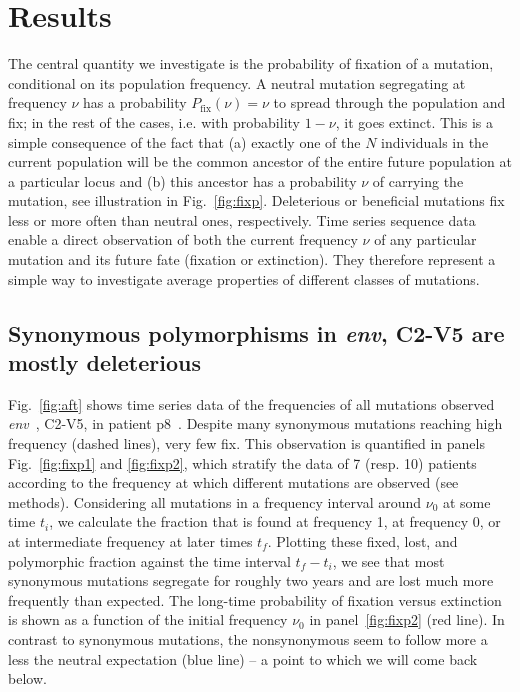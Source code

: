 \documentclass[rmp, twocolumn]{revtex4}
\newcommand{\env}{\textit{env}}
\newcommand{\FIG}[1]{Fig.~\ref{fig:#1}}
\begin{document}
\section{Results}

The central quantity we investigate is the probability of fixation of a
mutation, conditional on its population frequency.  A neutral mutation
segregating at frequency $\nu$ has a probability $P_\text{fix}(\nu) = \nu$ to
spread through the population and fix; in the rest of the cases, i.e. with
probability $1-\nu$, it goes extinct. This is a simple consequence of the fact
that (a) exactly one of the $N$ individuals in the current population will be
the common ancestor of the entire future population at a particular locus and
(b) this ancestor has a probability $\nu$ of carrying the mutation, see
illustration in \FIG{fixp}.  Deleterious or beneficial mutations fix less or
more often than neutral ones, respectively. Time series sequence data enable a
direct observation of both the current frequency $\nu$ of any particular
mutation and its future fate (fixation or extinction). They therefore represent
a simple way to investigate average properties of different classes of
mutations. 

\subsection{Synonymous polymorphisms in \env, C2-V5 are mostly deleterious}

\FIG{aft} shows time series data of the frequencies of all mutations observed
\env~, C2-V5, in patient p8~\citep{shankarappa_consistent_1999}. Despite many
synonymous mutations reaching high frequency (dashed lines), very few fix. This
observation is quantified in panels \FIG{fixp1} and \ref{fig:fixp2}, which
stratify the data of 7 (resp. 10) patients according to the frequency at which
different mutations are observed (see methods). Considering all mutations in a
frequency interval around $\nu_0$ at some time $t_i$, we calculate the fraction
that is found at frequency 1, at frequency 0, or at intermediate frequency at
later times $t_f$. Plotting these fixed, lost, and polymorphic fraction against
the time interval $t_f-t_i$, we see that most synonymous mutations segregate for
roughly two years and are lost much more frequently than expected. The long-time
probability of fixation versus extinction is shown as a function of the initial
frequency $\nu_0$ in panel~\ref{fig:fixp2} (red line). In contrast to synonymous
mutations, the nonsynonymous seem to follow more a less the neutral expectation
(blue line) -- a point to which we will come back below. 
\end{document}
